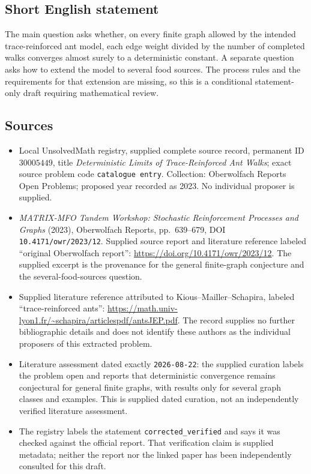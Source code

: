 \documentclass[11pt]{article}
\begin{document}
\subsection{Short English statement}
The main question asks whether, on every finite graph allowed by the intended trace-reinforced ant model, each edge weight divided by the number of completed walks converges almost surely to a deterministic constant. A separate question asks how to extend the model to several food sources. The process rules and the requirements for that extension are missing, so this is a conditional statement-only draft requiring mathematical review.
\subsection{Sources}
\begin{itemize}
\item Local UnsolvedMath registry, supplied complete source record, permanent ID \(30005449\), title \emph{Deterministic Limits of Trace-Reinforced Ant Walks}; exact source problem code \texttt{catalogue entry}. Collection: Oberwolfach Reports Open Problems; proposed year recorded as 2023. No individual proposer is supplied.
\item \emph{MATRIX-MFO Tandem Workshop: Stochastic Reinforcement Processes and Graphs} (2023), Oberwolfach Reports, pp.\ 639--679, DOI \texttt{10.4171/owr/2023/12}. Supplied source report and literature reference labeled ``original Oberwolfach report'': \url{https://doi.org/10.4171/owr/2023/12}. The supplied excerpt is the provenance for the general finite-graph conjecture and the several-food-sources question.
\item Supplied literature reference attributed to Kious--Mailler--Schapira, labeled ``trace-reinforced ants'': \url{https://math.univ-lyon1.fr/~schapira/articlespdf/antsJEP.pdf}. The record supplies no further bibliographic details and does not identify these authors as the individual proposers of this extracted problem.
\item Literature assessment dated exactly \texttt{2026-08-22}: the supplied curation labels the problem open and reports that deterministic convergence remains conjectural for general finite graphs, with results only for several graph classes and examples. This is supplied dated curation, not an independently verified literature assessment.
\item The registry labels the statement \texttt{corrected\_verified} and says it was checked against the official report. That verification claim is supplied metadata; neither the report nor the linked paper has been independently consulted for this draft.
\end{itemize}
\end{document}
